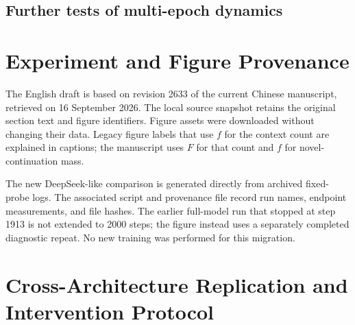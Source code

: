 
\subsection{Further tests of multi-epoch dynamics}


\section{Experiment and Figure Provenance}
\label{app:provenance}

The English draft is based on revision 2633 of the current Chinese manuscript, retrieved on 16 September 2026. The local source snapshot retains the original section text and figure identifiers. Figure assets were downloaded without changing their data. Legacy figure labels that use $f$ for the context count are explained in captions; the manuscript uses $F$ for that count and $f$ for novel-continuation mass.

The new DeepSeek-like comparison is generated directly from archived fixed-probe logs. The associated script and provenance file record run names, endpoint measurements, and file hashes. The earlier full-model run that stopped at step 1913 is not extended to 2000 steps; the figure instead uses a separately completed diagnostic repeat. No new training was performed for this migration.


\section{Cross-Architecture Replication and Intervention Protocol}
\label{app:deepseek}

